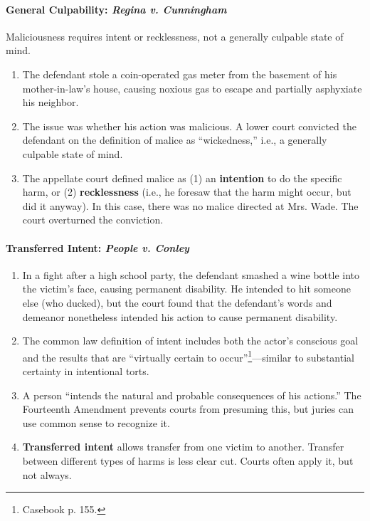 \paragraph{General Culpability: \emph{Regina v. Cunningham}}

Maliciousness requires intent or recklessness, not a generally culpable state 
of mind.

\begin{enumerate}
    \item The defendant stole a coin-operated gas meter from the basement of 
    his mother-in-law's house, causing noxious gas to escape and partially 
    asphyxiate his neighbor.
    \item The issue was whether his action was malicious. A lower court 
    convicted the defendant on the definition of malice as ``wickedness,'' 
    i.e., a generally culpable state of mind.
    \item The appellate court defined malice as (1) an \textbf{intention} to 
    do the specific harm, or (2) \textbf{recklessness} (i.e., he foresaw that 
    the harm might occur, but did it anyway). In this case, there was no 
    malice directed at Mrs. Wade. The court overturned the conviction.
\end{enumerate}

\paragraph{Transferred Intent: \emph{People v. Conley}}

\begin{enumerate}
    \item In a fight after a high school party, the defendant smashed a wine 
    bottle into the victim's face, causing permanent disability. He intended 
    to hit someone else (who ducked), but the court found that the defendant's 
    words and demeanor nonetheless intended his action to cause permanent 
    disability.
    \item The common law definition of intent includes both the actor's 
    conscious goal and the results that are ``virtually certain to 
    occur''\footnote{Casebook p. 155.}---similar to substantial certainty in 
    intentional torts.
    \item A person ``intends the natural and probable consequences of his 
    actions.'' The Fourteenth Amendment prevents courts from presuming this, 
    but juries can use common sense to recognize it.
    \item \textbf{Transferred intent}  allows transfer from one victim to 
    another. Transfer between different types of harms is less clear cut.  
    Courts often apply it, but not always.
\end{enumerate}


